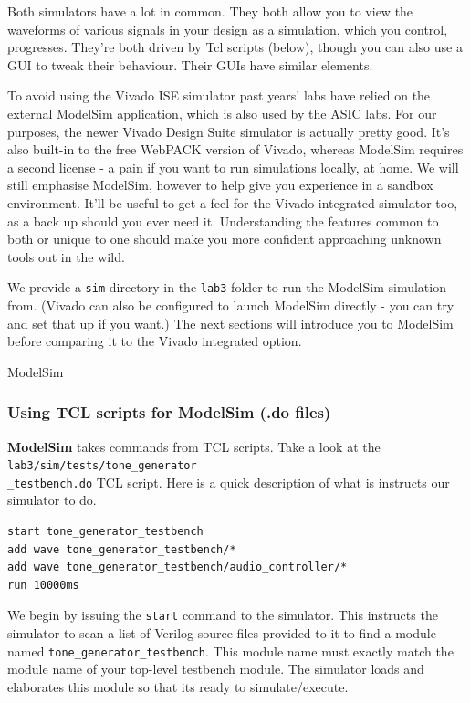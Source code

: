 \documentclass[11pt]{article}
\makeatletter
\renewcommand{\subsection}
{\@startsection {subsection}{1}{0pt}
 {-1ex}
 {0.5ex}
 {\bfseries\normalsize}}
\makeatother
\begin{document}
Both simulators have a lot in common. They both allow you to view the waveforms of various signals in your design as a simulation, which you control, progresses. They're both driven by Tcl scripts (below), though you can also use a GUI to tweak their behaviour. Their GUIs have similar elements.

To avoid using the Vivado ISE simulator past years' labs have relied on the external ModelSim application, which is also used by the ASIC labs. For our purposes, the newer Vivado Design Suite simulator is actually pretty good. It's also built-in to the free WebPACK version of Vivado, whereas ModelSim requires a second license - a pain if you want to run simulations locally, at home. We will still emphasise ModelSim, however to help give you experience in a sandbox environment. It'll be useful to get a feel for the Vivado integrated simulator too, as a back up should you ever need it. Understanding the features common to both or unique to one should make you more confident approaching unknown tools out in the wild.

We provide a \verb|sim| directory in the \verb|lab3| folder to run the ModelSim simulation from. (Vivado can also be configured to launch ModelSim directly - you can try and set that up if you want.) The next sections will introduce you to ModelSim before comparing it to the Vivado integrated option.

\subsection{ModelSim}
\subsubsection{Using TCL scripts for ModelSim (.do files)}

\textbf{ModelSim} takes commands from TCL scripts. Take a look at the \verb|lab3/sim/tests/tone_generator|\\\verb|_testbench.do| TCL script. Here is a quick description of what is instructs our simulator to do.

\begin{verbatim}
start tone_generator_testbench
add wave tone_generator_testbench/*
add wave tone_generator_testbench/audio_controller/*
run 10000ms
\end{verbatim}

We begin by issuing the \verb|start| command to the simulator. This instructs the simulator to scan a list of Verilog source files provided to it to find a module named \verb|tone_generator_testbench|. This module name must exactly match the module name of your top-level testbench module. The simulator loads and elaborates this module so that its ready to simulate/execute.
\end{document}
